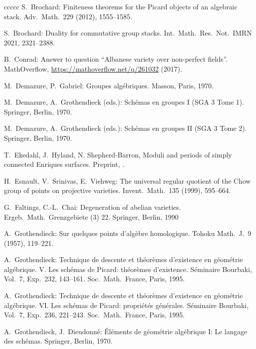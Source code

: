 \documentclass[oneside, 12pt]{amsart}
\theoremstyle{definition}
\theoremstyle{remark}
\begin{document}
\begin{thebibliography}{ccccc}
S.\ Brochard:
Finiteness theorems for the Picard objects of an algebraic stack. 
Adv.\ Math.\ 229 (2012), 1555--1585. 

S.\ Brochard:
Duality for commutative group stacks.  
Int.\ Math.\ Res.\ Not.\ IMRN 2021,  2321--2388. 

B.\ Conrad:
Answer to question ``Albanese variety over non-perfect fields''.
MathOverflow, \url{https://mathoverflow.net/q/261032} (2017).

M.\ Demazure, P.\ Gabriel:
Groupes alg\'ebriques.
Masson, Paris, 1970.

M.\ Demazure, A.\ Grothendieck (eds.):
Sch\'emas en groupes I (SGA 3 Tome 1).
Springer, Berlin, 1970.

M.\ Demazure, A.\ Grothendieck (eds.):
Sch\'emas en groupes II (SGA 3 Tome 2).
Springer, Berlin, 1970.
 
T.\ Ekedahl, J.\ Hyland, N. Shepherd-Barron, 
Moduli and periods of simply connected Enriques surfaces.
Preprint, .

H.\ Esnault, V.\ Srinivas, E.\  Viehweg:
The universal regular quotient of the Chow group of points on projective varieties. 
Invent.\ Math.\ 135 (1999), 595--664.

G.\ Faltings, C.-L.\ Chai:
Degeneration of abelian varieties. 
Ergeb.\ Math.\  Grenzgebiete (3)  22.
Springer, Berlin, 1990
 
A.\ Grothendieck:
Sur quelques points d'alg\`ebre homologique. 
Tohoku Math.\ J.\ 9 (1957), 119--221. 

A.\ Grothendieck:
Technique de descente et th\'eor\`emes d'existence en g\'eom\'etrie alg\'ebrique. V. 
Les sch\'emas de Picard: th\'eor\`emes d'existence. 
S\'eminaire Bourbaki, Vol.\ 7, Exp.\ 232, 143--161.
Soc.\ Math.\ France, Paris, 1995. 

A.\ Grothendieck:
Technique de descente et th\'eor\`emes d'existence en g\'eom\'etrie alg\'ebrique. VI. 
Les sch\'emas de Picard: propri\'et\'es g\'en\'erales. 
S\'eminaire Bourbaki, Vol.\ 7, Exp.\ 236, 221--243.
Soc.\ Math.\ France, Paris, 1995. 

A.\ Grothendieck, J.\ Dieudonn\'e:
\'El\'ements de g\'eom\'etrie alg\'ebrique I:
Le langage des sch\'emas.
Springer, Berlin, 1970.


\end{thebibliography}
\end{document}
